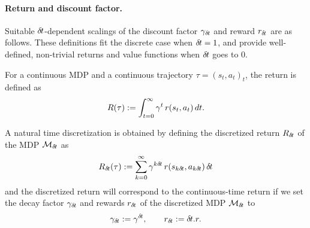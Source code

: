 



\paragraph{Return and discount factor.}
Suitable 
${\delta\hspace{-.1em}t}$-dependent scalings of the discount factor $\gamma_{\delta\hspace{-.1em}t}$
and reward $r_{\delta\hspace{-.1em}t}$ are as follows. These definitions fit the discrete case
when ${\delta\hspace{-.1em}t}=1$, and provide well-defined, non-trivial returns
and value functions when ${\delta\hspace{-.1em}t}$ goes to $0$.

For a continuous MDP and a continuous trajectory $\tau = (s_t, a_t)_t$,
the return is defined as~\cite{cont_rl}
\begin{equation}
\label{eq:continuous-return}
R(\tau) \mathrel{\mathop{:}}= \int_{t=0}^\infty\gamma^t\,r(s_t, a_t)\,dt.
\end{equation}

A natural time discretization is obtained  by defining the discretized
return $R_{\delta\hspace{-.1em}t}$ of the MDP $\mathcal{M}_{{\delta\hspace{-.1em}t}}$ as
\begin{equation}
\label{eq:discretized-return}
R_{\delta\hspace{-.1em}t}(\tau) \mathrel{\mathop{:}}= \sum_{k=0}^\infty\gamma^{k{\delta\hspace{-.1em}t}}\,
r(s_{k{\delta\hspace{-.1em}t}}, a_{k{\delta\hspace{-.1em}t}})\,{\delta\hspace{-.1em}t}
\end{equation}
and the discretized return will correspond to the continuous-time return
if we set the decay factor $\gamma_{\delta\hspace{-.1em}t}$ and rewards $r_{\delta\hspace{-.1em}t}$ of
the discretized MDP ${\cal M}_{\delta\hspace{-.1em}t}$ to
\begin{align}
\label{eq:def-gamma}
\gamma_{\delta\hspace{-.1em}t} \mathrel{\mathop{:}}= \gamma^{\delta\hspace{-.1em}t},\qquad
r_{\delta\hspace{-.1em}t} \mathrel{\mathop{:}}= {\delta\hspace{-.1em}t} . r.
\end{align}


